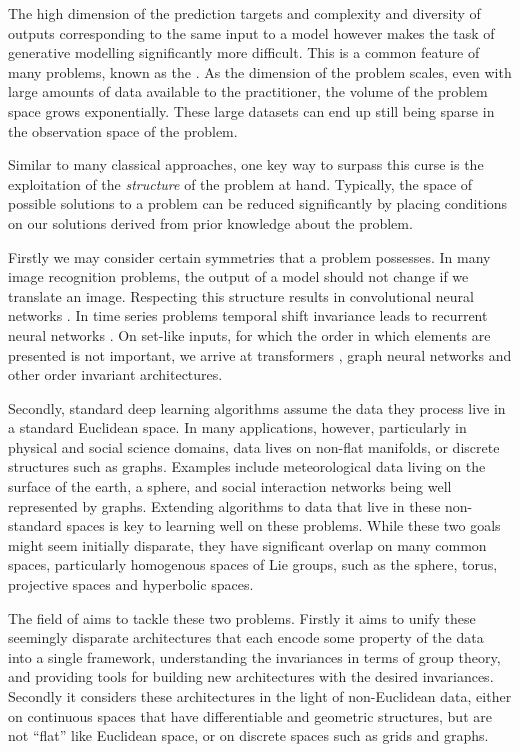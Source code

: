 The high dimension of the prediction targets and complexity and diversity of outputs corresponding to the same input to a model however makes the task of generative modelling significantly more difficult. 
This is a common feature of many problems, known as the  \parencite[page ix]{bellman1957dynamic}.
As the dimension of the problem scales, even with large amounts of data available to the practitioner, the volume of the problem space grows exponentially.
These large datasets can end up still being sparse in the observation space of the problem.

Similar to many classical approaches, one key way to surpass this curse is the exploitation of the \emph{structure} of the problem at hand.
Typically, the space of possible solutions to a problem can be reduced significantly by placing conditions on our solutions derived from prior knowledge about the problem.

Firstly we may consider certain symmetries that a problem possesses.
In many image recognition problems, the output of a model should not change if we translate an image.
Respecting this structure results in convolutional neural networks \parencite{fukushima1980neocognitron,waibel1989phoneme,lecun1989handwritten}.
In time series problems temporal shift invariance leads to recurrent neural networks \parencite{hochreiter1997long,rumelhart1986learning}.
On set-like inputs, for which the order in which elements are presented is not important, we arrive at transformers \parencite{vaswani2017attention}, graph neural networks \parencite{sperduti1993encoding} and other order invariant architectures.

Secondly, standard deep learning algorithms assume the data they process live in a standard Euclidean space.
In many applications, however, particularly in physical and social science domains, data lives on non-flat manifolds, or discrete structures such as graphs.
Examples include meteorological data living on the surface of the earth, a sphere, and social interaction networks being well represented by graphs.
Extending algorithms to data that live in these non-standard spaces is key to learning well on these problems.
While these two goals might seem initially disparate, they have significant overlap on many common spaces, particularly homogenous spaces of Lie groups, such as the sphere, torus, projective spaces and hyperbolic spaces.

The field of  \cite{bronstein2017geometric,bronstein2021geometric} aims to tackle these two problems.
Firstly it aims to unify these seemingly disparate architectures that each encode some property of the data into a single framework, understanding the invariances in terms of group theory, and providing tools for building new architectures with the desired invariances.
Secondly it considers these architectures in the light of non-Euclidean data, either on continuous spaces that have differentiable and geometric structures, but are not “flat” like Euclidean space, or on discrete spaces such as grids and graphs.

